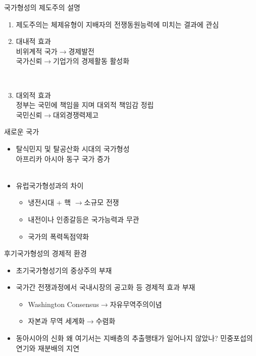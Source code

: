 \documentclass[xcolor=pdftex,dvipsnames]{beamer}
\renewcommand{\(}{\left(}
\renewcommand{\)}{\right)}
\begin{document}
\begin{frame}{국가형성의 제도주의 설명}
\begin{enumerate}
\item 제도주의는 체제유형이 지배자의 전쟁동원능력에 미치는 결과에 관심
\item 대내적 효과\\
비위계적 국가$\rightarrow$경제발전\\
국가신뢰$\rightarrow$기업가의 경제활동 활성화

\

\item 대외적 효과\\
정부는 국민에 책임을 지며 대외적 책임감 정립\\
국민신뢰$\rightarrow$대외경쟁력제고
\end{enumerate}
\end{frame}


\begin{frame}{새로운 국가}
\begin{itemize}
\item 탈식민지 및 탈공산화 시대의 국가형성\\
아프리카 아시아  동구 국가 증가\\

\

\item 유럽국가형성과의 차이\\
\begin{itemize}
\item 냉전시대 + 핵 $\rightarrow$소규모 전쟁
\item 내전이나 인종갈등은 국가능력과 무관
\item 국가의 폭력독점약화
\end{itemize}

\end{itemize}
\end{frame}

\begin{frame}{후기국가형성의 경제적 환경}
\begin{itemize}

\item 초기국가형성기의 중상주의 부재
\item 국가간 전쟁과정에서 국내시장의 공고화 등 경제적 효과 부재

\begin{itemize}
\item Washington Consensus$\rightarrow$자유무역주의이념
\item 자본과 무역 세계화$\rightarrow$수렴화
\end{itemize}

\item 동아시아의 신화
왜 여기서는 지배층의 추출행태가 일어나지 않았나?
민중포섭의 연기와 재분배의 지연
\end{itemize}
\end{frame}
\end{document}
